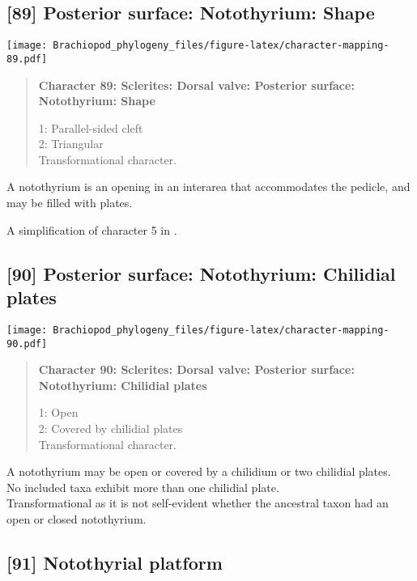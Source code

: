 \documentclass[openany]{book}
\theoremstyle{definition}
\theoremstyle{definition}
\theoremstyle{definition}
\theoremstyle{remark}
\begin{document}
\subsection*{{[}89{]} Posterior surface: Notothyrium:
Shape}\label{posterior-surface-notothyrium-shape}

\texttt{[image: Brachiopod\_phylogeny\_files/figure-latex/character-mapping-89.pdf]}

\begin{quote}
\textbf{Character 89: Sclerites: Dorsal valve: Posterior surface:
Notothyrium: Shape}

1: Parallel-sided cleft\\
2: Triangular\\
Transformational character.
\end{quote}

A notothyrium is an opening in an interarea that accommodates the
pedicle, and may be filled with plates.

A simplification of character 5 in
\citet{Bassett2001Functionalmorphology}.

\subsection*{{[}90{]} Posterior surface: Notothyrium: Chilidial
plates}\label{posterior-surface-notothyrium-chilidial-plates}

\texttt{[image: Brachiopod\_phylogeny\_files/figure-latex/character-mapping-90.pdf]}

\begin{quote}
\textbf{Character 90: Sclerites: Dorsal valve: Posterior surface:
Notothyrium: Chilidial plates}

1: Open\\
2: Covered by chilidial plates\\
Transformational character.
\end{quote}

A notothyrium may be open or covered by a chilidium or two chilidial
plates.\\
No included taxa exhibit more than one chilidial plate.\\
Transformational as it is not self-evident whether the ancestral taxon
had an open or closed notothyrium.

\subsection*{{[}91{]} Notothyrial platform}\label{notothyrial-platform}
\end{document}
